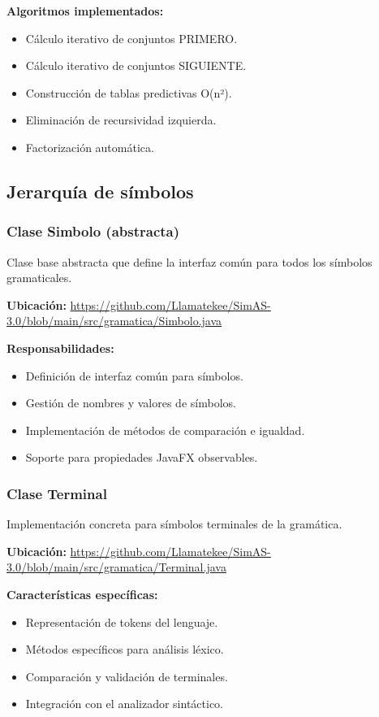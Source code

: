 \textbf{Algoritmos implementados:}
\begin{itemize}
    \item Cálculo iterativo de conjuntos PRIMERO.
    \item Cálculo iterativo de conjuntos SIGUIENTE.
    \item Construcción de tablas predictivas O(n²).
    \item Eliminación de recursividad izquierda.
    \item Factorización automática.
\end{itemize}

\subsection{Jerarquía de símbolos}

\subsubsection{Clase Simbolo (abstracta)}

Clase base abstracta que define la interfaz común para todos los símbolos gramaticales.

\textbf{Ubicación:} \url{https://github.com/Llamatekee/SimAS-3.0/blob/main/src/gramatica/Simbolo.java}

\textbf{Responsabilidades:}
\begin{itemize}
    \item Definición de interfaz común para símbolos.
    \item Gestión de nombres y valores de símbolos.
    \item Implementación de métodos de comparación e igualdad.
    \item Soporte para propiedades JavaFX observables.  
\end{itemize}

\subsubsection{Clase Terminal}

Implementación concreta para símbolos terminales de la gramática.

\textbf{Ubicación:} \url{https://github.com/Llamatekee/SimAS-3.0/blob/main/src/gramatica/Terminal.java}

\textbf{Características específicas:}
\begin{itemize}
    \item Representación de tokens del lenguaje.
    \item Métodos específicos para análisis léxico.
    \item Comparación y validación de terminales.
    \item Integración con el analizador sintáctico.
\end{itemize}

